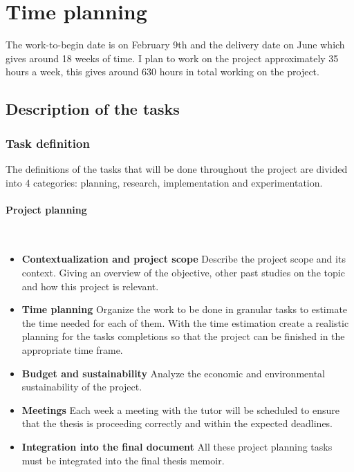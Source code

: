 
\section{Time planning}

The work-to-begin date is on February 9th and the delivery date on June which
gives around 18 weeks of time. I plan to work on the project approximately 35
hours a week, this gives around 630 hours in total working on the project.

\subsection{Description of the tasks}

\subsubsection{Task definition}

The definitions of the tasks that will be done throughout the project are
divided into 4 categories: planning, research, implementation and experimentation.

\paragraph{Project planning}\mbox{}\\

\begin{itemize}
    \item \textbf{Contextualization and project scope} Describe the project
        scope and its context. Giving an overview of the objective, other past
        studies on the topic and how this project is relevant.
    \item \textbf{Time planning} Organize the work to be done in granular tasks
        to estimate the time needed for each of them. With the time estimation
        create a realistic planning for the tasks completions so that the
        project can be finished in the appropriate time frame.
    \item \textbf{Budget and sustainability} Analyze the economic and
        environmental sustainability of the project.
    \item \textbf{Meetings} Each week a meeting with the tutor will be scheduled
        to ensure that the thesis is proceeding correctly and within the
        expected deadlines.
    \item \textbf{Integration into the final document} All these project
        planning tasks must be integrated into the final thesis memoir.
\end{itemize}

